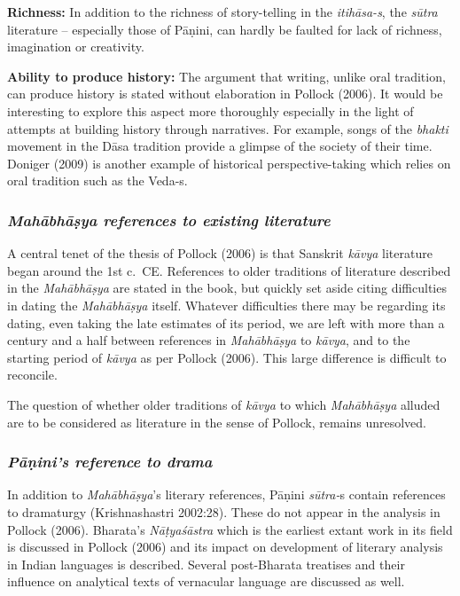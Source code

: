 {\bf Richness:} In addition to the richness of story-telling in the {\sl itihāsa-s}, the {\sl sūtra} literature – especially those of Pāṇini, can hardly be faulted for lack of richness, imagination or creativity.

{\bf Ability to produce history:} The argument that writing, unlike oral tradition, can produce history is stated without elaboration in Pollock (2006). It would be interesting to explore this aspect more thoroughly especially in the light of attempts at building history through narratives. For example, songs of the {\sl bhakti} movement in the Dāsa tradition provide a glimpse of the society of their time. Doniger (2009) is another example of historical perspective-taking which relies on oral tradition such as the Veda-s.
\newpage

\subsubsection{{\sl Mahābhāṣya references to existing literature}}

A central tenet of the thesis of Pollock (2006) is that Sanskrit {\sl kāvya} literature began around the 1st c.\ CE. References to older traditions of literature described in the {\sl Mahābhāṣya} are stated in the book, but quickly set aside citing difficulties in dating the {\sl Mahābhāṣya} itself. Whatever difficulties there may be regarding its dating, even taking the late estimates of its period, we are left with more than a century and a half between references in {\sl Mahābhāṣya} to {\sl kāvya}, and to the starting period of {\sl kāvya} as per Pollock (2006). This large difference is difficult to reconcile. 

The question of whether older traditions of {\sl kāvya} to which {\sl Mahābhāṣya} alluded are to be considered as literature in the sense of Pollock, remains unresolved.

\subsubsection{{\sl Pāṇini’s reference to drama}}

In addition to {\sl Mahābhāṣya}’s literary references, Pāṇini {\sl sūtra-}s contain references to dramaturgy (Krishnashastri 2002:28). These do not appear in the analysis in Pollock (2006). Bharata’s {\sl Nāṭyaśāstra} which is the earliest extant work in its field is discussed in Pollock (2006) and its impact on development of literary analysis in Indian languages is described. Several post-Bharata treatises and their influence on analytical texts of vernacular language are discussed as well.

